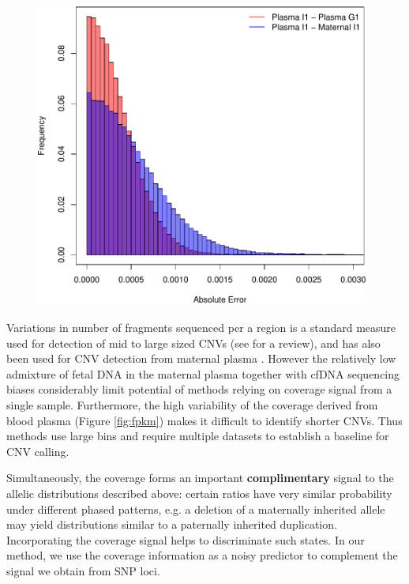 \begin{figure}
{\begin{minipage}[b]{0.48\textwidth}
	\includegraphics[width=0.98\textwidth]{figures/wrv_error_histo}
	\end{minipage}	
}
\end{figure}

Variations in number of fragments sequenced per a region is a standard measure used for detection of mid to large sized CNVs (see \cite{medvedev2009} for a review), and has also been used for CNV detection from maternal plasma \citep{srinivasan2013, chen2013}. However the relatively low admixture of fetal DNA in the maternal plasma together with cfDNA sequencing biases considerably limit potential of methods relying on coverage signal from a single sample. Furthermore, the high variability of the coverage derived from blood plasma (Figure \ref{fig:fpkm}) makes it difficult to identify shorter CNVs. Thus methods \cite{srinivasan2013, chen2013} use large bins and require multiple datasets to establish a baseline for CNV calling.

Simultaneously, the coverage forms an important \textbf{complimentary} signal to the allelic distributions described above: certain ratios have very similar probability under different phased patterns, e.g. a deletion of a maternally inherited allele may yield distributions similar to a paternally inherited duplication. Incorporating the coverage signal helps to discriminate such states. In our method, we use the coverage information as a noisy predictor to complement the signal we obtain from SNP loci.


